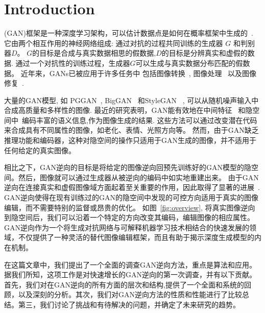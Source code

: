 \section{Introduction}
\label{sec:introduction}
 (GAN)框架是一种深度学习架构，可以估计数据点是如何在概率框架中生成的~\cite{goodfellow2014generative,goodfellow2016deep}.
它由两个相互作用的神经网络组成: 通过对抗的过程共同训练的生成器 $G$ 和判别器$D$。
$G$的目标是合成与真实数据相思的假数据,$D$的目标是分辨真实和虚假的数据.
通过一个对抗性的训练过程，生成器$G$可以生成与真实数据分布匹配的假数据。
近年来，GANs已被应用于许多任务中
包括图像转换~\cite{mao2019mode,lee2018drit,huang2018munit}, 图像处理~\cite{wang2018high,xia2020gaze,li2020manigan} 以及图像修复~\cite{zhang2017beyond,tsai2017deep,xu2017text,ma2017learning,li2018flow}.

大量的GAN模型, 如 PGGAN~\cite{karras2017progressive}, BigGAN~\cite{brock2018large} 和StyleGAN ~\cite{karras2019style,karras2020analyzing}, 可以从随机噪声输入中合成高质量和多样性的图像. 
最近的研究表明，GAN能有效地在中间特征~\cite{bau2019semantic} 和隐空间中~\cite{goetschalckx2019ganalyze,jahanian2020steerability, shen2020interpreting}编码丰富的语义信息,作为图像生成的结果.
这些方法可以通过改变潜在代码来合成具有不同属性的图像，如老化、表情、光照方向等。
然而，由于GAN缺乏推理功能和编码器，这种对隐空间的操作只适用于GAN生成的图像，并不适用于任何给定的真实图像。

\figoverview

相比之下，GAN逆向的目标是将给定的图像逆向回预先训练好的GAN模型的隐空间。然后，图像就可以通过生成器从被逆向的编码中如实地重建出来。
由于GAN逆向在连接真实和虚假图像域方面起着至关重要的作用，因此取得了显著的进展~\cite{zhu2016generative,abdal2019image2stylegan,abdal2020image2stylegan2,bau2019seeing,karras2020analyzing,huh2020transforming,pan2020exploiting,jahanian2020steerability,shen2020interpreting}. 
GAN逆向使得在现有训练过的GAN的隐空间中发现的可控方向适用于真实的图像编辑，而不需要特别的监督或昂贵的优化。
如图~\ref{fig:overview}, 将真实图像逆向到隐空间后，我们可以沿着一个特定的方向改变其编码，编辑图像的相应属性。
GAN逆向作为一个将生成对抗网络与可解释机器学习技术相结合的快速发展的领域，不仅提供了一种灵活的替代图像编辑框架，而且有助于揭示深度生成模型的内在机制。

在这篇文章中，我们提出了一个全面的调查GAN逆向方法，重点是算法和应用。据我们所知，这项工作是对快速增长的GAN逆向的第一次调查，并有以下贡献。首先，我们对在GAN逆向的所有方面的层次和结构,提供了一个全面和系统的回顾，以及深刻的分析。其次，我们对GAN逆向方法的性质和性能进行了比较总结。第三，我们讨论了挑战和有待解决的问题，并确定了未来研究的趋势。
